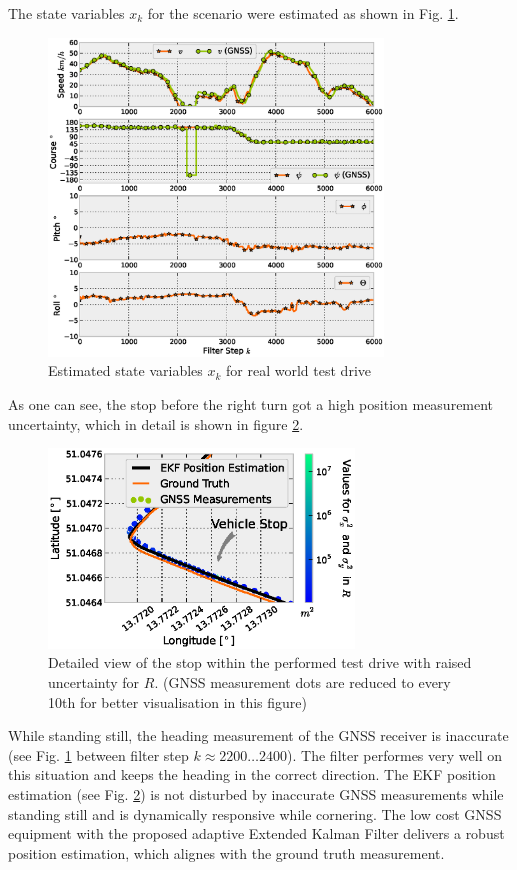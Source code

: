 \documentclass[conference]{IEEEtran}
\begin{document}
The state variables $x_k$ for the scenario were estimated as shown in Fig. \ref{ctrv-states}.

\begin{figure}[ht]
\centering
\includegraphics[width=3.5in]{images/Extended-Kalman-Filter-CTRV-Attitude-State-Estimates}
\caption{Estimated state variables $x_k$ for real world test drive}
\label{ctrv-states}
\end{figure}

As one can see, the stop before the right turn got a high position measurement uncertainty, which in detail is shown in figure \ref{ctrv-position-detail}.

\begin{figure}[ht]
\centering
\includegraphics[width=3.2in]{images/Extended-Kalman-Filter-CTRV-Position-Detail}
\caption{Detailed view of the stop within the performed test drive with raised uncertainty for $R$. (GNSS measurement dots are reduced to every 10th for better visualisation in this figure)}
\label{ctrv-position-detail}
\end{figure}

While standing still, the heading measurement of the GNSS receiver is inaccurate (see Fig. \ref{ctrv-states} between filter step $k\approx2200\dotsc2400$). The filter performes very well on this situation and keeps the heading in the correct direction. The EKF position estimation (see Fig. \ref{ctrv-position-detail}) is not disturbed by inaccurate GNSS measurements while standing still and is dynamically responsive while cornering. The low cost GNSS equipment with the proposed adaptive Extended Kalman Filter delivers a robust position estimation, which alignes with the ground truth measurement. 
\end{document}
